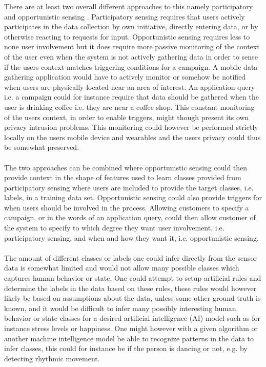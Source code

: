 There are at least two overall different approaches to this namely participatory and opportunistic sensing \parencite{opp_or_par} \parencite{har_wearables}. Participatory sensing requires that users actively participates in the data collection by own initiative, directly entering data, or by otherwise reacting to requests for input. Opportunistic sensing requires less to none user involvement but it does require more passive monitoring of the context of the user even when the system is not actively gathering data in order to sense if the users context matches triggering conditions for a campaign. A mobile data gathering application would have to actively monitor or somehow be notified when users are physically located near an area of interest. An application query i.e. a campaign could for instance require that data should be gathered when the user is drinking coffee i.e. they are near a coffee shop. This constant monitoring of the users context, in order to enable triggers, might though present its own privacy intrusion problems. This monitoring could however be performed strictly locally on the users mobile device and wearables and the users privacy could thus be somewhat preserved.
\\\\
The two approaches can be combined where opportunistic sensing could then provide context in the shape of features used to learn classes provided from participatory sensing where users are included to provide the target classes, i.e. labels, in a training data set. Opportunistic sensing could also provide triggers for when users should be involved in the process. Allowing customers to specify a campaign, or in the words of \parencite{opp_or_par} an application query, could then allow customer of the system to specify to which degree they want user involvement, i.e. participatory sensing, and when and how they want it, i.e. opportunistic sensing.
\\\\
The amount of different classes or labels one could infer directly from the sensor data is somewhat limited and would not allow many possible classes which captures human behavior or state. One could attempt to setup artificial rules and determine the labels in the data based on these rules, these rules would however likely be based on assumptions about the data, unless some other ground truth is known, and it would be difficult to infer many possibly interesting human behavior or state classes for a desired artificial intelligence (AI) model such as for instance stress levels or happiness. One might however with a given algorithm or another machine intelligence model be able to recognize patterns in the data to infer classes, this could for instance be if the person is dancing or not, e.g. by detecting rhythmic movement.    
